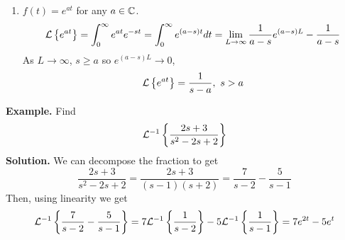 \documentclass[openany]{report}
\begin{document}
\begin{enumerate}
\begin{proof}
\begin{align*}
            &= -\frac{d}{ds} \frac{k!}{s^{k+1}}\\
            &= (k+1)\frac{k!}{s^{k+1+1}}\\
            &= \frac{(k+1)!}{s^{k+1+1}}
        \end{align*}
        Therefore $\laplace{t^n} = \frac{n!}{s^{n+1}}$ for all $n \in \nat$. 
    \end{proof}
    \item $f(t) = e^{at}$ for any $a \in \mathbb{C}$. 
    \[\mathcal{L}\left\{e^{at}\right\} = \int_0^\infty e^{at}e^{-st} = \int_0^\infty e^{(a-s)t}dt = \lim_{L\rightarrow \infty} \frac{1}{a-s}e^{(a-s)L} - \frac{1}{a-s}\]
    As $L \rightarrow \infty$, $s \geq a$ so $e^{(a-s)L} \rightarrow 0$, 
    \[\mathcal{L}\left\{e^{at}\right\} = \frac{1}{s-a}, \ s > a\]
\end{enumerate}
\noindent
\textbf{Example.} Find 
\[\mathcal{L}^{-1}\left\{\frac{2s+3}{s^2-2s+2}\right\}\]
\textbf{Solution.} We can decompose the fraction to get 
\[\frac{2s+3}{s^2-2s + 2} = \frac{2s+3}{(s-1)(s+2)} = \frac{7}{s-2} - \frac{5}{s-1}\]
Then, using linearity we get 
\[\mathcal{L}^{-1}\left\{\frac{7}{s-2} - \frac{5}{s-1}\right\} = 7\mathcal{L}^{-1}\left\{\frac{1}{s-2}\right\} -5\mathcal{L}^{-1}\left\{\frac{1}{s-1}\right\} = 7e^{2t} - 5e^t\]
\end{document}
